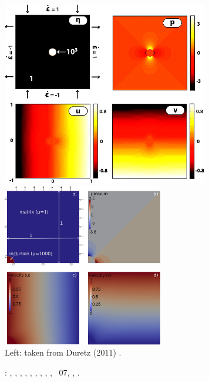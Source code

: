 \begin{center}
\includegraphics[width=9cm]{images/benchmark_solvi/dumg11}
\includegraphics[width=7cm]{images/benchmark_solvi/drawing}\\
{\captionfont Left: taken from Duretz \etal (2011) \cite{dumg11}. }
\end{center}

\Literature: 
\textcite{kapo06},
\textcite{maie12},
\textcite{deka08},
\textcite{bepo10},
\textcite{sunh10},
\textcite{vosc15},
\textcite{demh19},
\textcite{aspectmanual},
\textcite{litu02},
\stone~07,
\textcite{krhb12}, 
\textcite{gemd13}.
